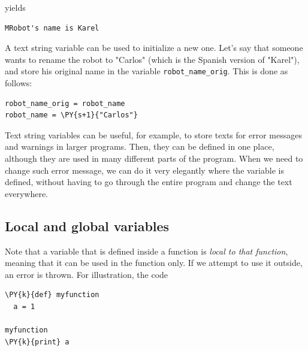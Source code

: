 \noindent
yields\\

\begin{ybox}
\begin{Verbatim}[commandchars=\\\{\}]
MRobot's name is Karel
\end{Verbatim}
\end{ybox}
\vspace{6mm}

\noindent
A text string variable can be used to initialize a new one. Let's say 
that someone wants to rename the robot to "Carlos" (which is the Spanish 
version of "Karel"),
and store his original name in the variable {\tt robot\_name\_orig}. 
This is done as follows:\\

\begin{bbox}
\begin{Verbatim}[commandchars=\\\{\}]
robot_name_orig = robot_name
robot_name = \PY{s+1}{"Carlos"}
\end{Verbatim}
\end{bbox}
\vspace{6mm}

\noindent
Text string variables can be useful, for example, to store texts for 
error messages and warnings in larger programs. Then, they can be 
defined in one place, although they are used in many different parts of 
the program. When we need to change such error message, we can do it 
very elegantly where the variable is defined, without having to go through 
the entire program and change the text everywhere.  

\subsection[\ \ Local and global variables]{Local and global variables}\label{subsec:karellocvar}

Note that a variable that is defined inside a function is {\em local to that function}, 
meaning that it can be used in the function only. If we attempt to use it 
outside, an error is thrown. For illustration, the code \\

\begin{bbox}
\begin{Verbatim}[commandchars=\\\{\}]
\PY{k}{def} myfunction
  a = 1

myfunction
\PY{k}{print} a  
\end{Verbatim}
\end{bbox}
\vspace{6mm}

